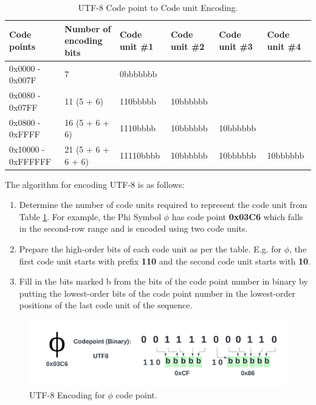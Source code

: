 {\renewcommand{\arraystretch}{1.5}%
\begin{table}[ht]
\centering
\begin{adjustbox}{width=1.1\textwidth,center=\textwidth}
\small
\begin{tabular}{|l|l|l|l|l|l|}
\hline
Code points        & Number of encoding bits & Code unit \#1 & Code unit \#2 & Code unit \#3 & Code unit \#4  \\
\hline
0x0000 - 0x007F & 7              & 0bbbbbbb &          &          &   \\
\hline
0x0080 - 0x07FF & 11 (5 + 6)     & 110bbbbb & 10bbbbbb &          &   \\
\hline
0x0800 - 0xFFFF & 16 (5 + 6 + 6) & 1110bbbb & 10bbbbbb & 10bbbbbb &   \\
\hline
0x10000 - 0xFFFFFF & 21 (5 + 6 + 6 + 6)      & 11110bbbb     & 10bbbbbb      & 10bbbbbb      & 10bbbbbb \\
\hline
\end{tabular}
\end{adjustbox}
\caption[UTF-8 Code Points Conversion]{UTF-8 Code point to Code unit Encoding.}\label{tab:utf8}
\end{table}}
The algorithm  for encoding UTF-8 \cite{utf8RFC} is as follows:
\begin{enumerate}
    \item Determine the number of code units required to represent the code unit from Table \ref{tab:utf8}. For example, the Phi Symbol $\phi$ has code point \textbf{0x03C6} which falls in the second-row range and is encoded using two code units.
    
    \item Prepare the high-order bits of each code unit as per the table. E.g. for $\phi$, the first code unit starts with prefix \textbf{110} and the second code unit starts with \textbf{10}.
    
    \item Fill in the bits marked b from the bits of the code point number in binary by putting the lowest-order bits of the code point number in the lowest-order positions of the last code unit of the sequence.
\end{enumerate}

\begin{figure}[htbp]
\includegraphics[trim=2cm 2cm 2cm 2cm,clip=true, width=\textwidth]{imgs/utf8-conv.png}
\caption[UTF8 Encoding]{UTF-8 Encoding for $\phi$ code point.}\label{fig:utf8-conv}
\end{figure}

